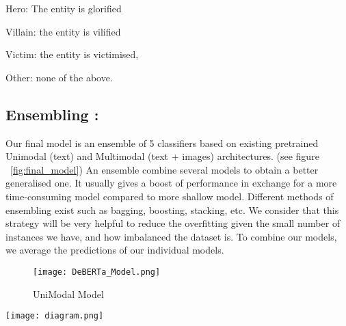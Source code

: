 \documentclass[11pt]{article}
\begin{document}
Hero: The entity is glorified

Villain: the entity is vilified

Victim: the entity is victimised,

Other: none of the above.

\subsection{Ensembling :}
Our final model is an ensemble of 5 classifiers based on existing pretrained Unimodal (text) and Multimodal (text + images)  architectures. (see figure ~\ref{fig:final_model})
An ensemble combine several models to obtain a better generalised one. It usually gives a boost of performance in exchange for a more time-consuming model compared to more shallow model. Different methods of ensembling exist such as bagging, boosting, stacking, etc. We consider that this strategy will be very helpful to reduce the overfitting given the small number of instances we have, and how imbalanced the dataset is.
To combine our models, we average the predictions of our individual models.\\


\begin{figure}
    \texttt{[image: DeBERTa\_Model.png]}
    \caption{UniModal Model}
    \label{fig:UniModal}
\end{figure}

\begin{figure*}\centering
    \texttt{[image: diagram.png]}
    \caption{Final model used for the Constraint22 competition.}
    \label{fig:final_model}
\end{figure*}
\end{document}

